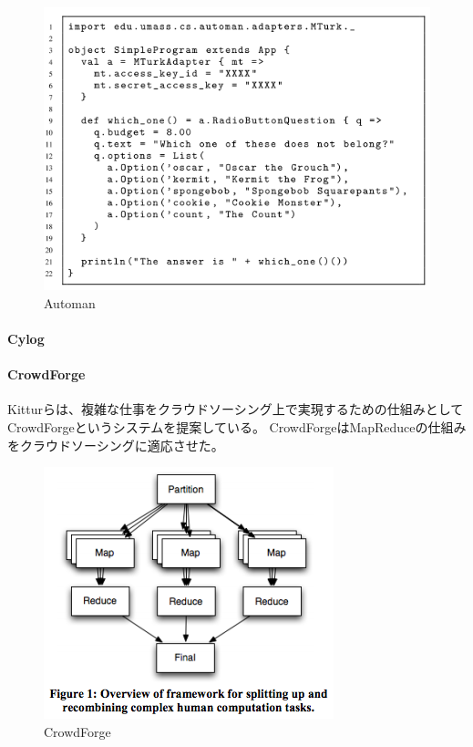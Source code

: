\begin{figure}[htbp]
  \begin{center}
  \includegraphics[width=.6\linewidth,bb=0 0 552 404]{images/automan.png}
  \end{center}
  \caption{Automan}
  \label{fig:automan}
\end{figure}

\paragraph{Cylog}\label{cylog}

\mbox{}

\cite{cylog}

\paragraph{CrowdForge}\label{crowdforge}

\mbox{}

Kitturら\cite{crowdforge}は、複雑な仕事をクラウドソーシング上で実現するための仕組みとして
CrowdForgeというシステムを提案している。
CrowdForgeはMapReduceの仕組みをクラウドソーシングに適応させた。

\begin{figure}[htbp]
  \begin{center}
  \includegraphics[width=.6\linewidth,bb=0 0 318 276]{images/crowdforge.png}
  \end{center}
  \caption{CrowdForge}
  \label{fig:crowdforge}
\end{figure}

